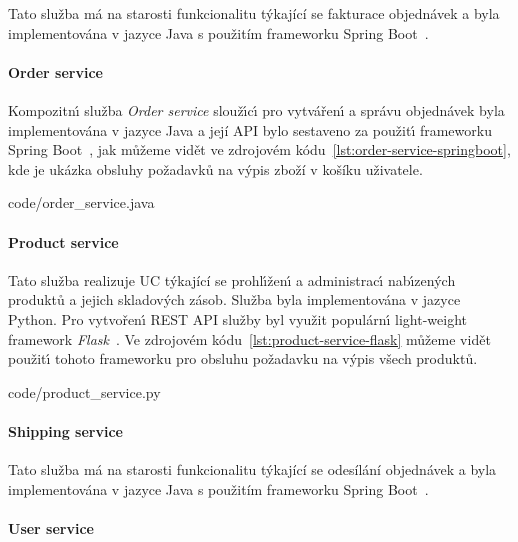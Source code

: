 Tato služba má na starosti funkcionalitu týkající se fakturace objednávek
a byla implementována v jazyce Java s použitím frameworku Spring Boot~\cite{springboot}.

\paragraph{Order service}

Kompozitn\'{\i} služba \textit{Order service} slouž\'{\i}c\'{\i} pro vytvářen\'{\i} a správu objednávek
byla implementována v jazyce Java a její \gls{API} bylo sestaveno za použit\'{\i} frameworku Spring
Boot~\cite{springboot}, jak můžeme vidět ve zdrojovém kódu~\ref{lst:order-service-springboot}, kde
je ukázka obsluhy požadavků na výpis zboží v košíku uživatele.


{code/order_service.java}

\paragraph{Product service}

Tato služba realizuje \gls{UC} týkající se prohl\'{\i}žen\'{\i} a administrac\'{\i} nab\'{\i}zen\'ych
produktů a jejich skladov\'ych zásob. Služba byla implementována v jazyce Python.
Pro vytvořen\'{\i} \gls{REST} \gls{API} služby byl využit populárn\'{\i}
light-weight framework \textit{Flask}~\cite{flask}.
Ve zdrojovém kódu~\ref{lst:product-service-flask} můžeme vidět použit\'{\i}
tohoto frameworku pro obsluhu požadavku na v\'ypis všech produktů.


{code/product_service.py}

\paragraph{Shipping service}

Tato služba má na starosti funkcionalitu týkající se odesílání objednávek
a byla implementována v jazyce Java s použitím frameworku Spring Boot~\cite{springboot}.

\paragraph{User service}

